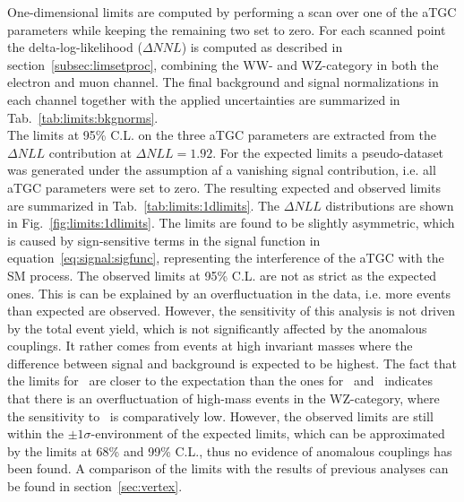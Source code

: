 One-dimensional limits are computed by performing a scan over one of the aTGC parameters while keeping the remaining two set to zero. For each scanned point the delta-log-likelihood ($\Delta NNL$) is computed as described in section~\ref{subsec:limsetproc}, combining the WW- and WZ-category in both the electron and muon channel. The final background and signal normalizations in each channel together with the applied uncertainties are summarized in Tab.~\ref{tab:limits:bkgnorms}.\\

\noindent The limits at 95\% C.L. on the three aTGC parameters are extracted from the $\Delta NLL$ contribution at $\Delta NLL=1.92$. For the expected limits a pseudo-dataset was generated under the assumption af a vanishing signal contribution, i.e. all aTGC parameters were set to zero. The resulting expected and observed limits are summarized in Tab.~\ref{tab:limits:1dlimits}. The $\Delta NLL$ distributions are shown in Fig.~\ref{fig:limits:1dlimits}. The limits are found to be slightly asymmetric, which is caused by sign-sensitive terms in the signal function in equation~\ref{eq:signal:sigfunc}, representing the interference of the aTGC with the SM process. The observed limits at 95\% C.L. are not as strict as the expected ones. This is can be explained by an overfluctuation in the data, i.e. more events than expected are observed. However, the sensitivity of this analysis is not driven by the total event yield, which is not significantly affected by the anomalous couplings. It rather comes from events at high invariant masses where the difference between signal and background is expected to be highest. The fact that the limits for \Tcb \ are closer to the expectation than the ones for \Tcwww \ and \Tccw \ indicates that there is an overfluctuation of high-mass events in the WZ-category, where the sensitivity to \Tcb \ is comparatively low. However, the observed limits are still within the $\pm 1\sigma$-environment of the expected limits, which can be approximated by the limits at 68\% and 99\% C.L., thus no evidence of anomalous couplings has been found. A comparison of the limits with the results of previous analyses can be found in section~\ref{sec:vertex}.\\

